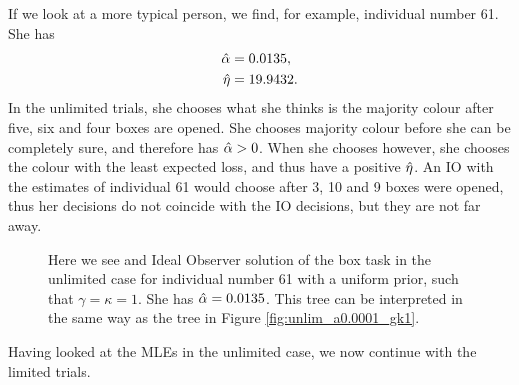 If we look at a more typical person, we find, for example, individual number 61. She has
\begin{equation}
\label{mles_unilim_person61}
    \begin{aligned}
        \hat{\alpha} &= 0.0135,\\
        \hat{\eta} &= 19.9432.
    \end{aligned}
\end{equation}
In the unlimited trials, she chooses what she thinks is the majority colour after five, six and four boxes are opened. She chooses majority colour before she can be completely sure, and therefore has $\hat{\alpha}>0$. When she chooses however, she chooses the colour with the least expected loss, and thus have a positive $\hat{\eta}$. An IO with the estimates of individual 61 would choose after 3, 10 and 9 boxes were opened, thus her decisions do not coincide with the IO decisions, but they are not far away.  
\begin{figure}
    \centering
    \scalebox{0.7}{}
    \caption[IO solution of individual number 61 with $\ha=0.0135$ and $\gamma=\kappa=1$]{Here we see and Ideal Observer solution of the box task in the unlimited case for individual number 61 with a uniform prior, such that $\gamma=\kappa=1$. She has $\ha=0.0135$. This tree can be interpreted in the same way as the tree in Figure \ref{fig:unlim_a0.0001_gk1}.}
    \label{fig:IO_sol_individual61}
\end{figure}

Having looked at the MLEs in the unlimited case, we now continue with the limited trials. 


